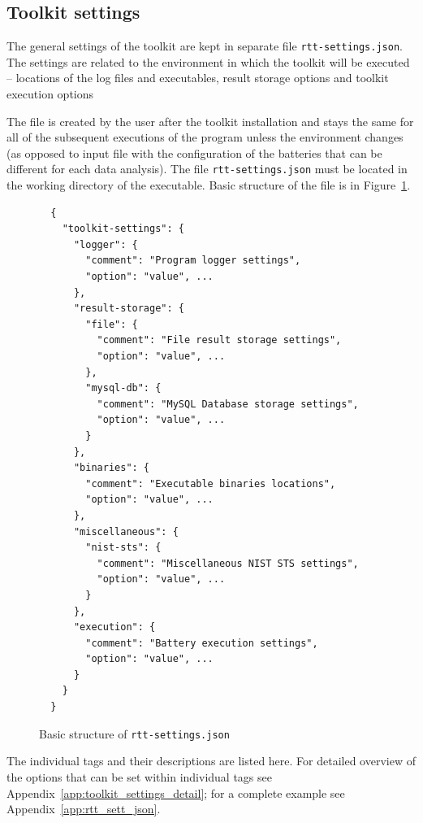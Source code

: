 \documentclass[
	digital,    %
	oneside,
	color,
	11pt,
	nocover,
	notable,
	nolof,
	nolot,
]{fithesis3}
\theoremstyle{definition}
\theoremstyle{remark}
\begin{document}
\subsection{Toolkit settings}
The general settings of the toolkit are kept in separate file \texttt{rtt-settings.json}. The settings are related to the environment in which the toolkit will be executed -- locations of the log files and executables, result storage options and toolkit execution options 

The file is created by the user after the toolkit installation and stays the same for all of the subsequent executions of the program unless the environment changes (as opposed to input file with the configuration of the batteries that can be different for each data analysis). The file \texttt{rtt-settings.json} must be located in the working directory of the executable. Basic structure of the file is in Figure~\ref{fig:rtt_sett_short_json}.

\begin{figure}[h!]
\begin{verbatim}
  {
    "toolkit-settings": {
      "logger": {
        "comment": "Program logger settings",
        "option": "value", ...
      },
      "result-storage": {
        "file": {
          "comment": "File result storage settings",
          "option": "value", ...
        },
        "mysql-db": {
          "comment": "MySQL Database storage settings",
          "option": "value", ...
        }
      },
      "binaries": {
        "comment": "Executable binaries locations",
        "option": "value", ...
      },    
      "miscellaneous": {
        "nist-sts": {
          "comment": "Miscellaneous NIST STS settings",
          "option": "value", ...
        }
      },
      "execution": {
        "comment": "Battery execution settings",
        "option": "value", ...
      }
    }
  }
\end{verbatim}
\caption{Basic structure of \texttt{rtt-settings.json}}
\label{fig:rtt_sett_short_json}
\end{figure}

The individual tags and their descriptions are listed here. For detailed overview of the options that can be set within individual tags see Appendix~\ref{app:toolkit_settings_detail}; for a complete example see Appendix~\ref{app:rtt_sett_json}. 
\end{document}
